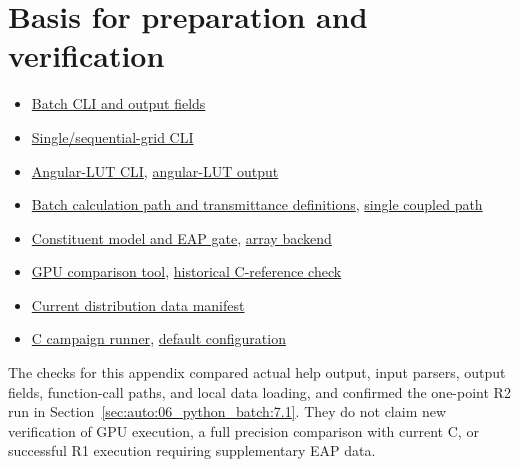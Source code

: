 \section{Basis for preparation and verification}
\label{sec:auto:06_python_batch:11}
\begin{itemize}
\item \href{https://github.com/brtnt/OCRT/blob/54861c68e35ec5aaa3938fad53e93dc2dfa7eb1d/code/OCRT_Python/produce_grid.py}{Batch CLI and output fields}
\item \href{https://github.com/brtnt/OCRT/blob/54861c68e35ec5aaa3938fad53e93dc2dfa7eb1d/code/OCRT_Python/ocrt_solve.py}{Single/sequential-grid CLI}
\item \href{https://github.com/brtnt/OCRT/blob/54861c68e35ec5aaa3938fad53e93dc2dfa7eb1d/code/OCRT_Python/ocrt_fullgrid.py}{Angular-LUT CLI}, \href{https://github.com/brtnt/OCRT/blob/54861c68e35ec5aaa3938fad53e93dc2dfa7eb1d/code/OCRT_Python/ocrt_py/lut.py}{angular-LUT output}
\item \href{https://github.com/brtnt/OCRT/blob/54861c68e35ec5aaa3938fad53e93dc2dfa7eb1d/code/OCRT_Python/ocrt_py/batch_driver.py}{Batch calculation path and transmittance definitions}, \href{https://github.com/brtnt/OCRT/blob/54861c68e35ec5aaa3938fad53e93dc2dfa7eb1d/code/OCRT_Python/ocrt_py/driver.py}{single coupled path}
\item \href{https://github.com/brtnt/OCRT/blob/54861c68e35ec5aaa3938fad53e93dc2dfa7eb1d/code/OCRT_Python/ocrt_py/constituent.py}{Constituent model and EAP gate}, \href{https://github.com/brtnt/OCRT/blob/54861c68e35ec5aaa3938fad53e93dc2dfa7eb1d/code/OCRT_Python/ocrt_py/backend.py}{array backend}
\item \href{https://github.com/brtnt/OCRT/blob/54861c68e35ec5aaa3938fad53e93dc2dfa7eb1d/code/OCRT_Python/gpu_gate.py}{GPU comparison tool}, \href{https://github.com/brtnt/OCRT/blob/54861c68e35ec5aaa3938fad53e93dc2dfa7eb1d/code/OCRT_Python/verify.py}{historical C-reference check}
\item \href{https://github.com/brtnt/OCRT/blob/54861c68e35ec5aaa3938fad53e93dc2dfa7eb1d/scripts/MIE_SHA256SUMS_data-v1.txt}{Current distribution data manifest}
\item \href{https://github.com/brtnt/OCRT/blob/54861c68e35ec5aaa3938fad53e93dc2dfa7eb1d/code/campaign_runner/runner/run_campaign.py}{C campaign runner}, \href{https://github.com/brtnt/OCRT/blob/54861c68e35ec5aaa3938fad53e93dc2dfa7eb1d/code/campaign_runner/config/polarization_campaign_pssa_16core.json}{default configuration}
\end{itemize}

The checks for this appendix compared actual help output, input parsers, output fields, function-call paths, and local data loading, and confirmed the one-point R2 run in Section~\ref{sec:auto:06_python_batch:7.1}. They do not claim new verification of GPU execution, a full precision comparison with current C, or successful R1 execution requiring supplementary EAP data.
\endgroup

